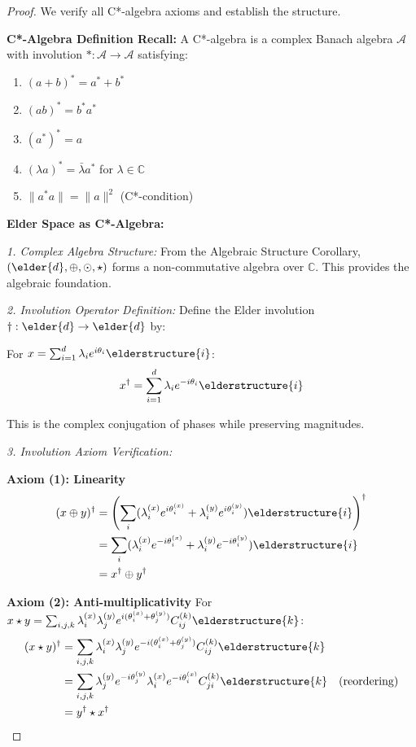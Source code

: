 \begin{proof}
We verify all C*-algebra axioms and establish the structure.

\textbf{C*-Algebra Definition Recall:}
A C*-algebra is a complex Banach algebra $\mathcal{A}$ with involution $*: \mathcal{A} \rightarrow \mathcal{A}$ satisfying:
\begin{enumerate}
\item $(a + b)^* = a^* + b^*$
\item $(ab)^* = b^* a^*$
\item $(a^*)^* = a$
\item $(\lambda a)^* = \bar{\lambda} a^*$ for $\lambda \in \mathbb{C}$
\item $\|a^* a\| = \|a\|^2$ (C*-condition)
\end{enumerate}

\textbf{Elder Space as C*-Algebra:}

\textit{1. Complex Algebra Structure:}
From the Algebraic Structure Corollary, $(\elder{d}, \oplus, \odot, \star)$ forms a non-commutative algebra over $\mathbb{C}$. This provides the algebraic foundation.

\textit{2. Involution Operator Definition:}
Define the Elder involution $\dagger: \elder{d} \rightarrow \elder{d}$ by:

For $x = \sum_{i=1}^{d} \lambda_i e^{i\theta_i} \elderstructure{i}$:
$$x^{\dagger} = \sum_{i=1}^{d} \lambda_i e^{-i\theta_i} \elderstructure{i}$$

This is the complex conjugation of phases while preserving magnitudes.

\textit{3. Involution Axiom Verification:}

\textbf{Axiom (1): Linearity}
\begin{align}
(x \oplus y)^{\dagger} &= \left(\sum_{i} (\lambda_i^{(x)} e^{i\theta_i^{(x)}} + \lambda_i^{(y)} e^{i\theta_i^{(y)}}) \elderstructure{i}\right)^{\dagger} \\
&= \sum_{i} (\lambda_i^{(x)} e^{-i\theta_i^{(x)}} + \lambda_i^{(y)} e^{-i\theta_i^{(y)}}) \elderstructure{i} \\
&= x^{\dagger} \oplus y^{\dagger}
\end{align}

\textbf{Axiom (2): Anti-multiplicativity}
For $x \star y = \sum_{i,j,k} \lambda_i^{(x)} \lambda_j^{(y)} e^{i(\theta_i^{(x)} + \theta_j^{(y)})} C_{ij}^{(k)} \elderstructure{k}$:
\begin{align}
(x \star y)^{\dagger} &= \sum_{i,j,k} \lambda_i^{(x)} \lambda_j^{(y)} e^{-i(\theta_i^{(x)} + \theta_j^{(y)})} C_{ij}^{(k)} \elderstructure{k} \\
&= \sum_{i,j,k} \lambda_j^{(y)} e^{-i\theta_j^{(y)}} \lambda_i^{(x)} e^{-i\theta_i^{(x)}} C_{ji}^{(k)} \elderstructure{k} \quad \text{(reordering)} \\
&= y^{\dagger} \star x^{\dagger}
\end{align}


\end{proof}
